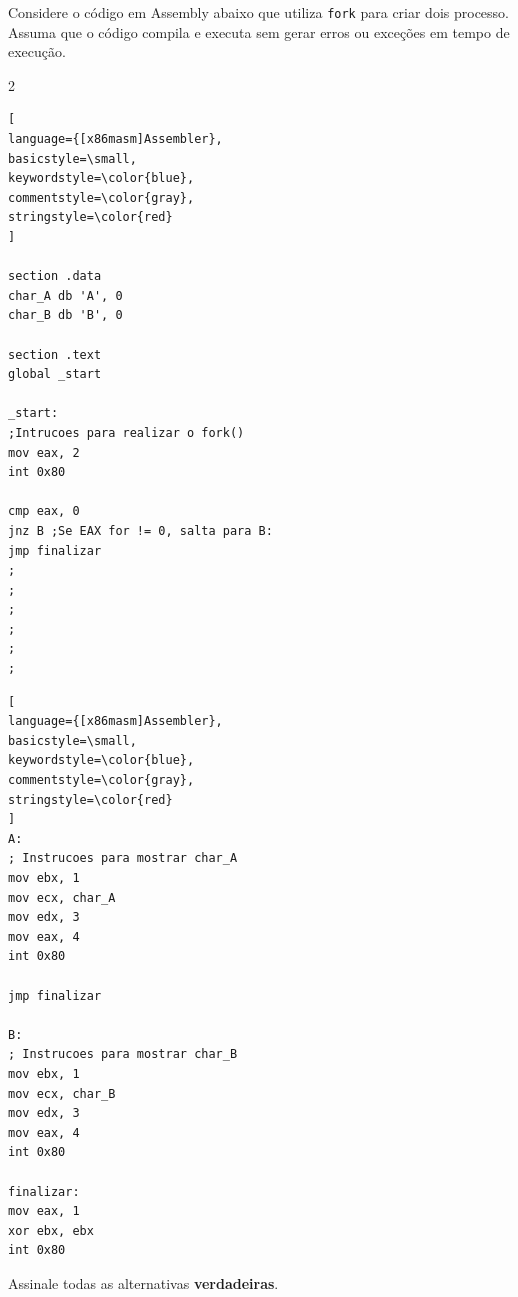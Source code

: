 %
%
%
{
\def\AMCbeginQuestion#1#2{\par\noindent{\bf (PCS3746 - 2025)}}
\begin{question}{} Considere o código em Assembly abaixo que utiliza \texttt{fork} para criar dois processo. Assuma que o código compila e executa sem gerar erros ou exceções em tempo de execução.

\begin{multicols}{2}\columnseprule=0.1pt
\begin{lstlisting}[
language={[x86masm]Assembler},
basicstyle=\small,
keywordstyle=\color{blue},
commentstyle=\color{gray},
stringstyle=\color{red}
]

section .data
char_A db 'A', 0
char_B db 'B', 0

section .text
global _start

_start:
;Intrucoes para realizar o fork()
mov eax, 2
int 0x80	

cmp eax, 0
jnz B ;Se EAX for != 0, salta para B:
jmp finalizar
;
;
;
;
;
;
\end{lstlisting}
\begin{lstlisting}[
language={[x86masm]Assembler},
basicstyle=\small,
keywordstyle=\color{blue},
commentstyle=\color{gray},
stringstyle=\color{red}
]
A:
; Instrucoes para mostrar char_A
mov ebx, 1
mov ecx, char_A
mov edx, 3
mov eax, 4
int 0x80

jmp finalizar

B:
; Instrucoes para mostrar char_B
mov ebx, 1
mov ecx, char_B
mov edx, 3
mov eax, 4
int 0x80

finalizar:
mov eax, 1
xor ebx, ebx
int 0x80
\end{lstlisting}
\end{multicols}

Assinale todas as alternativas \textbf{verdadeiras}.	
\begin{choices}

\end{choices}
\end{question}
}
